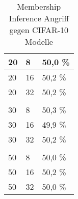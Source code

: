 \begin{table}[!htb]
\begin{tabular}{lll}
\multicolumn{1}{|l|}{20}       & \multicolumn{1}{l|}{8}  & \multicolumn{1}{l|}{50,0 \%} \\ \hline
\multicolumn{1}{|l|}{20}       & \multicolumn{1}{l|}{16} & \multicolumn{1}{l|}{50,2 \%} \\ \hline
\multicolumn{1}{|l|}{20}       & \multicolumn{1}{l|}{32} & \multicolumn{1}{l|}{50,2 \%} \\ \hline
                               &                         &                              \\ \hline
\multicolumn{1}{|l|}{30}       & \multicolumn{1}{l|}{8}  & \multicolumn{1}{l|}{50,3 \%} \\ \hline
\multicolumn{1}{|l|}{30}       & \multicolumn{1}{l|}{16} & \multicolumn{1}{l|}{49,9 \%} \\ \hline
\multicolumn{1}{|l|}{30}       & \multicolumn{1}{l|}{32} & \multicolumn{1}{l|}{50,2 \%} \\ \hline
                               &                         &                              \\ \hline
\multicolumn{1}{|l|}{50}       & \multicolumn{1}{l|}{8}  & \multicolumn{1}{l|}{50,0 \%} \\ \hline
\multicolumn{1}{|l|}{50}       & \multicolumn{1}{l|}{16} & \multicolumn{1}{l|}{50,2 \%} \\ \hline
\multicolumn{1}{|l|}{50}       & \multicolumn{1}{l|}{32} & \multicolumn{1}{l|}{50,0 \%} \\ \hline
\end{tabular}
\caption{Membership Inference Angriff gegen CIFAR-10 Modelle}
\label{tab:mi_cifar10_total}
\end{table}